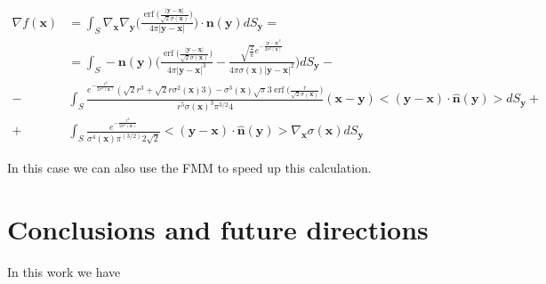 \documentclass[11pt, oneside]{article}
\DeclareMathOperator\erf{erf}
\newcommand\bx{\boldsymbol x}
\newcommand\by{\boldsymbol y}
\newcommand\bn{\boldsymbol n}
\begin{document}
\begin{equation}
\begin{aligned}
\nabla f(\bx)&=\int_{\mathit{S}}\nabla_{\bx}\nabla_{\by}\Big(\frac{\erf\big(\frac{|\by-\bx|}{\sqrt{2}\sigma(\bx)}\big)}{4\pi|\by-\bx|}\Big)\cdot\bn(\by)dS_{\by}=\\
&=\int_{\mathit{S}}-\bn(\by)\Bigg(\frac{\erf\big(\frac{|\by-\bx|}{\sqrt{2}\sigma(\bx)}\big)}{4\pi|\by-\bx|^3}-\frac{\sqrt{\frac{2}{\pi}}e^{-\frac{|\by-\bx|^2}{2\sigma^2(\bx)}}}{4\pi\sigma(\bx)|\by-\bx|^2}\Bigg)dS_{\by}-\\
-&\int_{\mathit{S}} \frac{e^{-\frac{r^2}{2\sigma^2(\bx)}}(\sqrt{2}r^3+\sqrt{2}r\sigma^2(\bx)3)-\sigma^3(\bx)\sqrt{\pi}3\erf{\big(\frac{r}{\sqrt{2}\sigma(\bx)}}\big)}{r^5\sigma(\bx)^3\pi^{3/2}4}(\bx-\by)<(\by-\bx)\cdot \hat{\bn}(\by)>dS_{\by}+\\
+&\int_{\mathit{S}} \frac{e^{-\frac{r^2}{2\sigma^2(\bx)}}}{\sigma^4(\bx)\pi^(3/2)2\sqrt{2}}<(\by-\bx)\cdot \hat{\bn}(\by)>\nabla_{\bx}\sigma(\bx)dS_{\by}
\end{aligned}
\end{equation}

In this case we can also use the FMM to speed up this calculation.



\section{Conclusions and future directions}
\label{sec_conclusions}

In this work we have 









  
\end{document}
